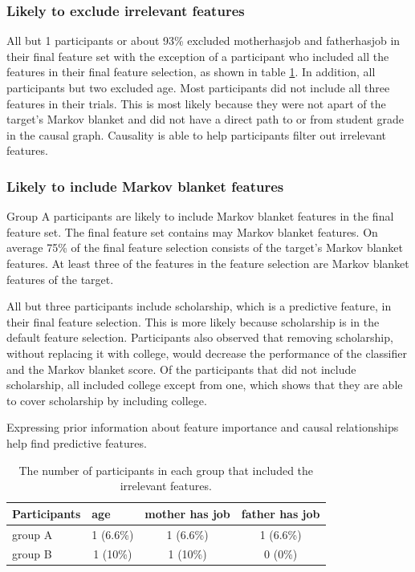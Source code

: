 \subsubsection { Likely to exclude irrelevant features }
All but 1 participants or about 93\% excluded motherhasjob and fatherhasjob in their final feature set with the exception of a participant who included all the features in their final feature selection, as shown in table \ref{IrrelevantFeatures}. In addition, all participants but two excluded age. Most participants did not include all three features in their trials. This is most likely because they were not apart of the target's Markov blanket and did not have a direct path to or from student grade in the causal graph. Causality is able to help participants filter out irrelevant features.

\subsubsection { Likely to include Markov blanket features }
Group A participants are likely to include Markov blanket features in the final feature set. The final feature set contains may Markov blanket features. On average 75\% of the final feature selection consists of the target's Markov blanket features. At least three of the features in the feature selection are Markov blanket features of the target.

All but three participants include scholarship, which is a predictive feature, in their final feature selection. This is more likely because scholarship is in the default feature selection. Participants also observed that removing scholarship, without replacing it with college, would decrease the performance of the classifier and the Markov blanket score. Of the participants that did not include scholarship, all included college except from one, which shows that they are able to cover scholarship by including college.

Expressing prior information about feature importance and causal relationships help find predictive features.

\begin{table}[]
\centering
\begin{tabular}{lccc}
\hline
Participants & \multicolumn{1}{l}{age} & \multicolumn{1}{l}{mother has job} & \multicolumn{1}{l}{father has job} \\ \hline
group A      & 1 (6.6\%)                &  1 (6.6\%)     &  1 (6.6\%)                                  \\
group B      & 1 (10\%)                 &  1 (10\%)   & 0 (0\%) \\\hline
\end{tabular}
\caption{The number of participants in each group that included the irrelevant features.}
\label{IrrelevantFeatures}
\end{table}


